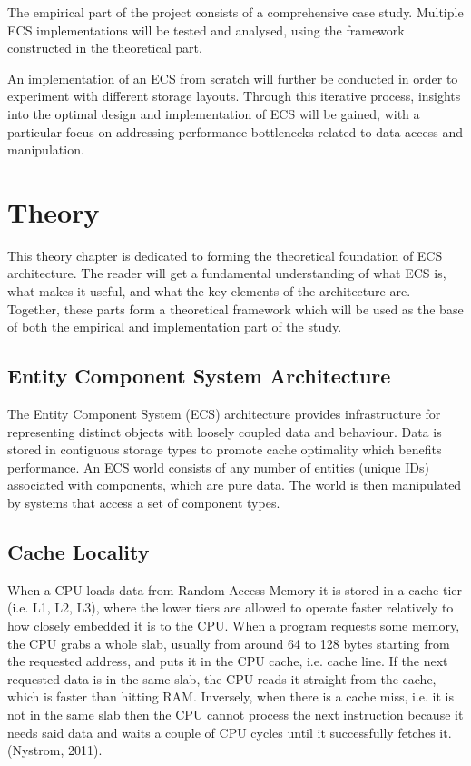 \documentclass[openany, amssymb, psamsfonts]{amsart}
\theoremstyle{definition}
\numberwithin{equation}{section}
\begin{document}
The empirical part of the project consists of a comprehensive case study. Multiple ECS implementations will be tested and analysed, using the framework constructed in the theoretical part. 

An implementation of an ECS from scratch will further be conducted in order to experiment with different storage layouts. Through this iterative process, insights into the optimal design and implementation of ECS will be gained, with a particular focus on addressing performance bottlenecks related to data access and manipulation.

\section{Theory}
This theory chapter is dedicated to forming the theoretical foundation of ECS architecture. The reader will get a fundamental understanding of what ECS is, what makes it useful, and what the key elements of the architecture are. Together, these parts form a theoretical framework which will be used as the base of both the empirical and implementation part of the study.

\subsection{Entity Component System Architecture}
The Entity Component System (ECS) architecture provides infrastructure for representing distinct objects with loosely coupled data and behaviour. Data is stored in contiguous storage types to promote cache optimality which benefits performance. An ECS world consists of any number of entities (unique IDs) associated with components, which are pure data. The world is then manipulated by systems that access a set of component types. 
\subsection{Cache Locality}
When a CPU loads data from Random Access Memory it is stored in a cache tier (i.e. L1, L2, L3), 
where the lower tiers are allowed to operate faster relatively to how closely 
embedded it is to the CPU.\cite{Flecs} When a program requests some memory, the CPU grabs a whole slab, usually from around 64 to 128 bytes starting from the requested address, and puts it in the CPU cache, i.e. cache line. If the next requested data is in the same slab, the CPU reads it straight from the cache, which is faster than hitting RAM. Inversely, when there is a cache miss, i.e. it is not in the same slab then the CPU cannot process the next instruction because it needs said data and waits a couple of CPU cycles until it successfully fetches it. (Nystrom, 2011). 
\end{document}
